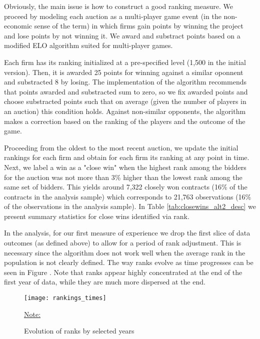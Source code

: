 Obviously, the main issue is how to construct a good ranking measure. We proceed by  modeling each auction as a multi-player game event (in the non-economic sense of the term) in which firms gain points by winning the project and lose points by not winning it. We award and substract points based on a modified ELO algorithm suited for multi-player games.

Each firm has its ranking initialized at a pre-specified level (1,500 in the initial version). Then, it is awarded 25 points for winning against a similar oponnent and substracted 8 by losing. The implementation of the algorithm recommends that points awarded and substracted sum to zero, so we fix awarded points and choose substracted points such that on average (given the number of players in an auction) this condition holds. Against non-similar opponents, the algorithm makes a correction based on the ranking of the players and the outcome of the game.

Proceeding from the oldest to the most recent auction, we update the initial rankings for each firm and obtain for each firm its ranking at any point in time. Next, we label a win as a "close win" when the highest rank among the bidders for the auction was not more than 3\% higher than the lowest rank among the same set of bidders. This yields around 7,322 closely won contracts (16\% of the contracts in the analysis sample) which corresponds to 21,763 observations (16\% of the observations in the analysis sample). In Table \ref{tab:closewins_alt2_desc} we present summary statistics for close wins identified via rank.



In the analysis, for our first measure of experience we drop the first slice of data outcomes (as defined above) to allow for a period of rank adjustment. This is necessary since the algorithm does not work well when the average rank in the population is not clearly defined. The way ranks evolve as time progresses  can be seen in Figure \label{fig:rankings_times}. Note that ranks appear highly concentrated at the end of the first year of data, while they are much more dispersed at the end.

\begin{figure}
  \texttt{[image: rankings\_times]}
  \caption{Evolution of ranks by selected years}
  \label{fig:rankings_times}
  \vskip 0.5mm
  { \footnotesize \underline{Note:} \par}
\end{figure}

